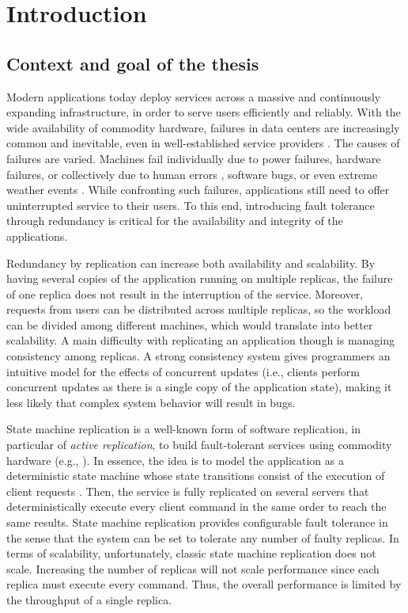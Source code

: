 \chapter[Introduction]{Introduction}

\section{Context and goal of the thesis}

Modern applications today deploy services across a massive and
continuously expanding infrastructure, in order to serve users efficiently
and reliably. With the wide availability of commodity hardware, failures in data
centers are increasingly common and inevitable, even in well-established service
providers \cite{disruption:google}. The causes of failures are varied. Machines
fail individually due to power failures, hardware failures, or collectively due
to human errors \cite{disruption:amazon}, software bugs, or even extreme weather
events \cite{disruption:weather}. While confronting such failures, applications
still need to offer uninterrupted service to their users. To this end,
introducing fault tolerance through redundancy is critical for the availability
and integrity of the applications.

Redundancy by replication can increase both availability and scalability. By
having several copies of the application running on multiple replicas, the
failure of one replica does not result in the interruption of the service.
Moreover, requests from users can be distributed across multiple replicas, so
the workload can be divided among different machines, which would translate into
better scalability. A main difficulty with replicating an application though is
managing consistency among replicas. A strong consistency system gives
programmers an intuitive model for the effects of concurrent updates (i.e.,
clients perform concurrent updates as there is a single copy of the application
state), making it less likely that complex system behavior will result in bugs.

State machine replication is a well-known form of software replication, in
particular of \emph{active replication}, to build fault-tolerant services using
commodity hardware (e.g.,
\cite{shvachko2010hadoop,ghemawat2003google,burrows2006chubby,maccormick2004boxwood}). In essence,
the idea is to model the application as a deterministic state machine whose
state transitions consist of the execution of client requests \cite{Lam78,
Sch90}. Then, the service is fully replicated on several servers that
deterministically execute every client command in the
same order to reach the same results. State machine replication provides
configurable fault tolerance in the sense that the system can be set to tolerate
any number of faulty replicas. In terms of scalability, unfortunately, classic
state machine replication does not scale. Increasing the number of replicas will
not scale performance since each replica must execute every command. Thus, the
overall performance is limited by the throughput of a single replica.

